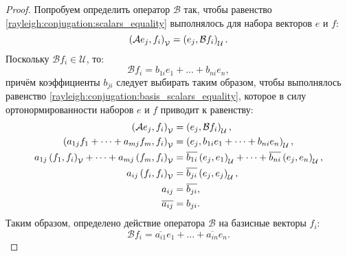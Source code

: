 \begin{proof}
    Попробуем определить оператор $\mathcal{B}$ так, чтобы равенство \eqref{rayleigh:conjugation:scalars_equality} выполнялось для набора векторов $e$ и $f$:
    \begin{equation}
        \label{rayleigh:conjugation:basis_scalars_equality}
        \left ( \mathcal{A} e_j, f_i \right )_\mathcal{V} = \left ( e_j, \mathcal{B} f_i \right )_\mathcal{U} .
    \end{equation}
    Поскольку $\mathcal{B} f_i \in \mathcal{U}$, то:
    \[
        \mathcal{B} f_i = b_{1i} e_1 + \dots + b_{ni} e_n ,
    \]
    причём коэффициенты $b_{ji}$ следует выбирать таким образом, чтобы выполнялось равенство \eqref{rayleigh:conjugation:basis_scalars_equality}, которое в силу
    ортонормированности наборов $e$ и $f$ приводит к равенству:
    \begin{align*}
        \left ( \mathcal{A} e_j, f_i \right )_\mathcal{V} & = \left ( e_j, \mathcal{B} f_i \right )_\mathcal{U} , \\
        \left ( a_{1j} f_1 + \dots + a_{mj} f_m, f_i \right )_\mathcal{V} & = \left ( e_j, b_{1i} e_1 + \dots + b_{ni} e_n \right )_\mathcal{U} , \\
        a_{1j} \left ( f_1, f_i \right )_\mathcal{V} + \dots + a_{mj} \left ( f_m, f_i \right )_\mathcal{V} & = \overline{b_{1i}} \left ( e_j, e_1 \right )_\mathcal{U} + \dots + \overline{b_{ni}} \left ( e_j, e_n \right )_\mathcal{U} , \\
        a_{ij} \left ( f_i, f_i \right )_\mathcal{V} & = \overline{b_{ji}} \left ( e_j, e_j \right )_\mathcal{U} , \\
        a_{ij} & = \overline{b_{ji}} , \\
        \overline{a_{ij}} & = b_{ji} .
    \end{align*}
    Таким образом, определено действие оператора $\mathcal{B}$ на базисные векторы $f_i$:
    \begin{equation}
        \label{rayleigh:conjugation:basis_images}
        \mathcal{B} f_i = \overline{a_{i1}} e_1 + \dots + \overline{a_{in}} e_n .
    \end{equation}


\end{proof}
